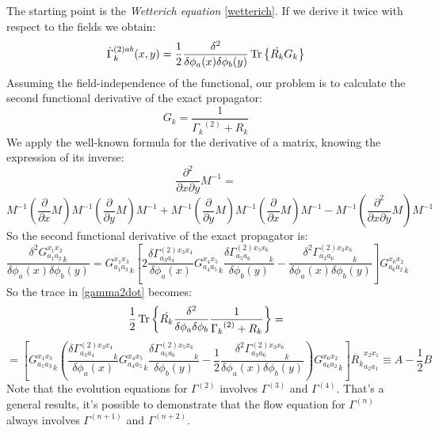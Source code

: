The starting point is the \emph{Wetterich equation} \eqref{wetterich}. If we derive it twice with respect to the fields we obtain:
\begin{equation}\label{gamma2dot}
\dot{\Gamma}^{(2)ab}_k(x,y)= \frac{1}{2}\frac{\delta^2 }{\delta\phi_a(x)\delta\phi_b(y)}\operatorname{Tr}\left\{\dot{R_k}G_k\right\} 
\end{equation}
Assuming the field-independence of the functional, our problem is to calculate
the second functional derivative of the exact propagator:
$$G_k = \frac{1}{{\Gamma_k}^{(2)} + R_k}$$
We apply the well-known formula for the derivative of a matrix, knowing the expression of its inverse:
$$\frac{\partial^2}{\partial x\partial y} M^{-1} = $$
$$M^{-1}\left(\frac{\partial}{\partial x} M \right)M^{-1}\left(\frac{\partial}{\partial y} M \right) M^{-1} + M^{-1}\left(\frac{\partial}{\partial y} M \right)M^{-1}\left(\frac{\partial}{\partial x} M \right) M^{-1} -  M^{-1}\left(\frac{\partial^2}{\partial x\partial y} M \right) M^{-1}$$
So the second functional derivative of the exact propagator is:
\begin{equation}\label{trecento11}
 \frac{\delta^2 {G^{x_1 x_2}_{a_1a_2}}_k }{\delta \phi_a(x) \delta \phi_b(y)}= {G^{x_1 x_3}_{a_1a_3}}_k \left[ 2\frac{\delta {\Gamma^{(2)x_3 x_4}_{a_3a_4}}}{\delta \phi_a(x)}{G_{a_4a_5}^{x_4x_5}}_k \frac{\delta {\Gamma_{a_5a_6}^{(2)x_5 x_6}}_k}{\delta \phi_b(y)} - \frac{\delta^2{\Gamma_{a_3a_6}^{(2)x_3x_6}}_k}{\delta \phi_a(x) \delta \phi_b(y)}\right] {G^{x_6x_2}_{a_6a_2}}_k
\end{equation}
So the trace in \eqref{gamma2dot} becomes:
\begin{equation}
\frac{1}{2}\operatorname{Tr}\left\{ \dot{R_k}\frac{\delta^2 }{\delta\phi_a\delta\phi_b}\frac{1}{{\Gamma_k}^{(2)} + R_k}\right\} = 
\end{equation}
\begin{equation}
 = \left[ {G^{x_1 x_3}_{a_1a_3}}_k \left(\frac{\delta {\Gamma^{(2)x_3 x_4}_{a_3a_4}}_k}{\delta \phi_a(x)}{G_{a_4a_5}^{x_4x_5}}_k \frac{\delta {\Gamma_{a_5a_6}^{(2)x_5 x_6}}_k}{\delta \phi_b(y)} - \frac{1}{2}\frac{\delta^2{\Gamma_{a_3a_6}^{(2)x_3x_6}}_k}{\delta \phi_a(x) \delta \phi_b(y)}\right) {G^{x_6x_2}_{a_6a_2}}_k \right]{\dot{R_k}_{a_2a_1}^{x_2 x_1}}\equiv A - \frac{1}{2}B
\end{equation}
Note that the evolution equations for $\Gamma^{(2)}$ involves $\Gamma^{(3)}$ and $\Gamma^{(4)}$. That's a general results, it's possible to demonstrate that the flow equation 
for $\Gamma^{(n)}$ always involves $\Gamma^{(n+1)}$ and $\Gamma^{(n+2)}$.

